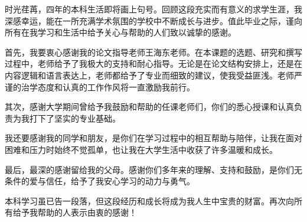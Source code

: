 \begin{acknowledgements} 

时光荏苒，四年的本科生活即将画上句号。回顾这段充实而有意义的求学生涯，我深感幸运，能在一所充满学术氛围的学校中不断成长与进步。值此毕业之际，谨向所有在我学习和生活中给予关心与帮助的人们致以诚挚的感谢。

首先，我要衷心感谢我的论文指导老师王海东老师。在本课题的选题、研究和撰写过程中，老师给予了我极大的支持和耐心指导。无论是在论文结构安排上，还是在内容逻辑和语言表达上，老师都给予了专业而细致的建议，使我受益匪浅。老师严谨的治学态度和认真的工作作风将一直激励我前行。

其次，感谢大学期间曾给予我鼓励和帮助的任课老师们，你们的悉心授课和认真负责为我打下了坚实的专业基础。

我还要感谢我的同学和朋友，是你们在学习过程中的相互帮助与陪伴，让我在面对困难和压力时始终不觉孤单，也让我在大学生活中收获了许多温暖和成长。

最后，最深的感谢留给我的父母。感谢你们多年来的理解、支持和鼓励，是你们无条件的爱与信任，给予了我安心学习的动力与勇气。

本科学习虽已告一段落，但这段经历和成长将成为我人生中宝贵的财富。再次向所有给予我帮助的人表示由衷的感谢！

\end{acknowledgements}

